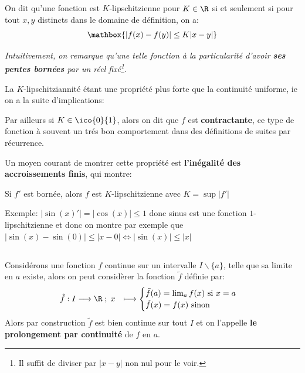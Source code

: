 On dit qu'une fonction est \(K\)-lipschitzienne pour \(K \in \R\) si et seulement si pour tout \(x, y\) distincts dans le domaine de définition, on a:
\[
   \mathbox{|f(x) - f(y)| \leq K|x - y|}   
\]
\begin{center}
   \textit{
      Intuitivement, on remarque qu'une telle fonction à la particularité d'avoir \textbf{ses pentes bornées} par un réel fixé\footnote[1]{Il suffit de diviser par \(|x - y|\) non nul pour le voir.}.
   }
\end{center}
La \(K\)-lipschitziannité étant une propriété plus forte que la continuité uniforme, ie on a la suite d'implications:
\begin{center}
\end{center}
Par ailleurs si \(K \in \ico{0}{1}\), alors on dit que \(f\) est \textbf{contractante}, ce type de fonction à souvent un trés bon comportement dans des définitions de suites par récurrence.\<

Un moyen courant de montrer cette propriété  est \textbf{l'inégalité des accroissements finis}, qui montre:
\begin{center}
   Si \(f'\) est bornée, alors \(f\) est \(K\)-lipschitzienne avec \(K = \sup|f'|\)
\end{center}
Exemple: \(|\sin(x)'| = |\cos(x)| \leq 1\) donc sinus est une fonction \(1\)-lipschitzienne et donc on montre par exemple que \(|\sin(x) - \sin(0)| \leq |x - 0| \Longleftrightarrow |\sin(x)| \leq |x|\)

\subsection*{}
Considérons une fonction \(f\) continue sur un intervalle \(I \backslash \{a\}\), telle que sa limite en \(a\) existe, alors on peut considèrer la fonction \(\tilde{f}\) définie par:
\[
   \begin{aligned}
      \tilde{f}: I &\longrightarrow \R \; ; \; x &\longmapsto \begin{cases}
         \tilde{f}(a) = \lim_{a} f(x) \text{ si } x = a\\
         \tilde{f}(x) = f(x) \text{ sinon}
      \end{cases}
   \end{aligned}
\]
Alors par construction \(\tilde{f}\) est bien continue sur tout \(I\) et on l'appelle \textbf{le prolongement par continuité} de \(f\) en \(a\).

